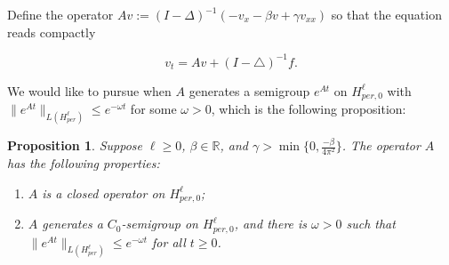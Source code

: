 \documentclass[10pt,a4paper,final]{article}
\numberwithin{equation}{section}
\newtheorem{prop}[theorem]{Proposition}
\newcommand{\lan}{\langle}
\newcommand{\ran}{\rangle}
\newcommand{\R}{\mathbb{R}}
\newcommand{\Gb}{\beta}
\newcommand{\Gg}{\gamma}
\newcommand{\Go}{\omega}
\begin{document}

Define the operator $Av:=(I-\Delta)^{-1}(-v_x-\Gb v+\Gg v_{xx})$ so that the equation reads compactly

$$v_t = Av + (I-\triangle)^{-1}f.$$

We would like to pursue when $A$ generates a semigroup $e^{At}$ on $H^{\ell}_{per, 0}$ with $\|e^{At}\|_{L(H^{\ell}_{per})}\leq e^{-\omega t}$ for some $\omega>0$, which is the following proposition:

\begin{prop}\label{prop3-1}
    Suppose $\ell\ge0$, $\Gb\in \R$, and $\Gg>\min\{0, \frac{-\Gb}{4\pi^2}\}$. The operator $A$ has the following properties:
    \begin{enumerate}
        \item $A$ is a closed operator on $H^{\ell}_{per, 0}$;
        \item $A$ generates a $C_0$-semigroup on $H^{\ell}_{per, 0}$, and there is $\Go>0$ such that $\|e^{At}\|_{L(H^{\ell}_{per})}\leq e^{-\Go t}$ for all $t\geq 0$.
    \end{enumerate}
\end{prop}
\end{document}
